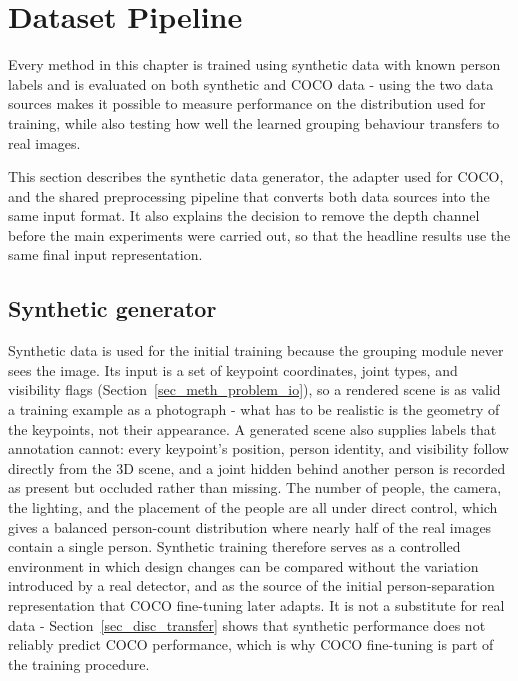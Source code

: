 \section{Dataset Pipeline}
\label{sec_meth_data}

Every method in this chapter is trained using synthetic data with known person labels
and is evaluated on both synthetic and COCO data -
using the two data sources makes it possible
to measure performance on the distribution used for training,
while also testing how well the learned grouping behaviour transfers to real images.

This section describes the synthetic data generator,
the adapter used for COCO,
and the shared preprocessing pipeline that converts both data sources into the same input format.
It also explains the decision to remove the depth channel before the main experiments were carried out,
so that the headline results use the same final input representation.

\subsection{Synthetic generator}
\label{sec_meth_data_synth}

Synthetic data is used for the initial training because the grouping module never sees the image.
Its input is a set of keypoint coordinates, joint types, and visibility flags (Section~\ref{sec_meth_problem_io}),
so a rendered scene is as valid a training example as a photograph -
what has to be realistic is the geometry of the keypoints, not their appearance.
A generated scene also supplies labels that annotation cannot:
every keypoint's position, person identity, and visibility follow directly from the 3D scene,
and a joint hidden behind another person is recorded as present but occluded rather than missing.
The number of people, the camera, the lighting, and the placement of the people are all under direct control,
which gives a balanced person-count distribution
where nearly half of the real images contain a single person.
Synthetic training therefore serves as a controlled environment in which design changes can be compared
without the variation introduced by a real detector,
and as the source of the initial person-separation representation that COCO fine-tuning later adapts.
It is not a substitute for real data -
Section~\ref{sec_disc_transfer} shows that synthetic performance does not reliably predict COCO performance,
which is why COCO fine-tuning is part of the training procedure.

